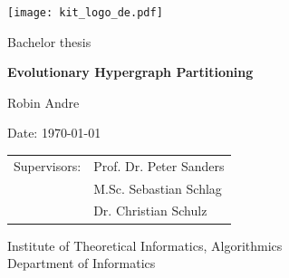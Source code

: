 \documentclass[a4paper,12pt,titlepage, BCOR7mm,headsepline]{scrbook}
\numberwithin{equation}{section}
\begin{document}
%


\pagestyle{empty} %
\renewcommand{\thepage}{\roman{page}}

\begin{titlepage}

  \begin{center}\large
  \begin{flushleft}
    \quad\texttt{[image: kit\_logo\_de.pdf]} \hfill

\end{flushleft}
    \vfill
    \vfill
    \vfill
    \vfill

    Bachelor thesis
    \vspace*{2cm}

    {\bf\huge Evolutionary Hypergraph Partitioning  \par}

    \vfill

    Robin Andre

    \vspace*{15mm}

    Date: \today 

    \vspace*{40mm}
    \begin{tabular}{rl}
      Supervisors: & Prof. Dr. Peter Sanders \\
      & M.Sc. Sebastian Schlag \\
      & Dr. Christian Schulz 
      
    \end{tabular}
    
    \vspace*{10mm}


    \vspace*{10mm}
     Institute of Theoretical Informatics, Algorithmics \\
     Department of Informatics \\

    \vspace*{12mm}
    \vfill
  \end{center}

\end{titlepage}
\end{document}
